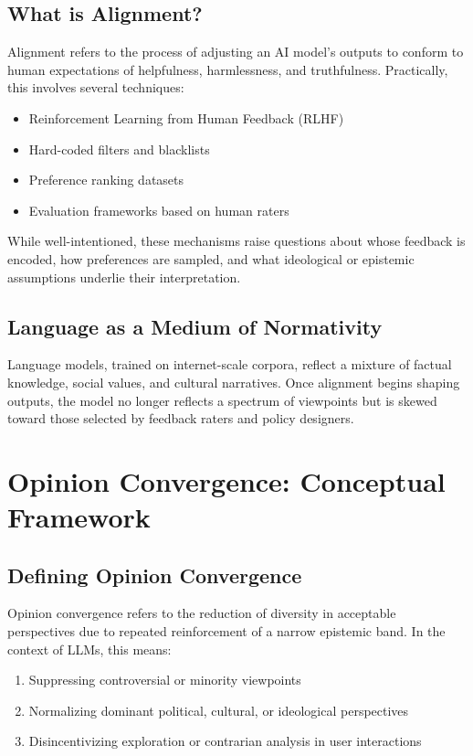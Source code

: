 \documentclass[11pt]{article}
\begin{document}
\subsection{What is Alignment?}
Alignment refers to the process of adjusting an AI model's outputs to conform to human expectations of helpfulness, harmlessness, and truthfulness. Practically, this involves several techniques:
\begin{itemize}
    \item Reinforcement Learning from Human Feedback (RLHF)
    \item Hard-coded filters and blacklists
    \item Preference ranking datasets
    \item Evaluation frameworks based on human raters
\end{itemize}
While well-intentioned, these mechanisms raise questions about whose feedback is encoded, how preferences are sampled, and what ideological or epistemic assumptions underlie their interpretation.

\subsection{Language as a Medium of Normativity}
Language models, trained on internet-scale corpora, reflect a mixture of factual knowledge, social values, and cultural narratives. Once alignment begins shaping outputs, the model no longer reflects a spectrum of viewpoints but is skewed toward those selected by feedback raters and policy designers.

\section{Opinion Convergence: Conceptual Framework}

\subsection{Defining Opinion Convergence}
Opinion convergence refers to the reduction of diversity in acceptable perspectives due to repeated reinforcement of a narrow epistemic band. In the context of LLMs, this means:
\begin{enumerate}
    \item Suppressing controversial or minority viewpoints
    \item Normalizing dominant political, cultural, or ideological perspectives
    \item Disincentivizing exploration or contrarian analysis in user interactions
\end{enumerate}
\end{document}
